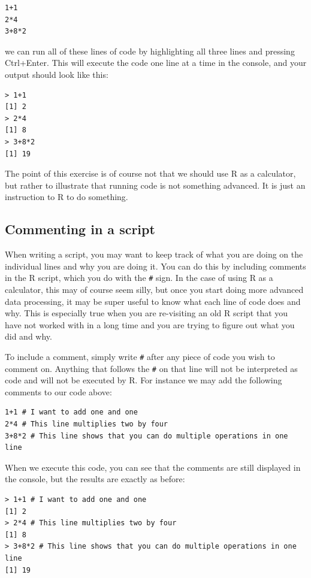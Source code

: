 \documentclass[
]{book}
\begin{document}
\begin{verbatim}
1+1
2*4
3+8*2
\end{verbatim}

we can run all of these lines of code by highlighting all three lines and pressing Ctrl+Enter. This will execute the code one line at a time in the console, and your output should look like this:

\begin{verbatim}
> 1+1
[1] 2
> 2*4
[1] 8
> 3+8*2
[1] 19
\end{verbatim}

The point of this exercise is of course not that we should use R as a calculator, but rather to illustrate that running code is not something advanced. It is just an instruction to R to do something.

\hypertarget{commenting-in-a-script}{%
\subsection{Commenting in a script}\label{commenting-in-a-script}}

When writing a script, you may want to keep track of what you are doing on the individual lines and why you are doing it. You can do this by including comments in the R script, which you do with the \texttt{\#} sign. In the case of using R as a calculator, this may of course seem silly, but once you start doing more advanced data processing, it may be super useful to know what each line of code does and why. This is especially true when you are re-visiting an old R script that you have not worked with in a long time and you are trying to figure out what you did and why.

To include a comment, simply write \texttt{\#} after any piece of code you wish to comment on. Anything that follows the \texttt{\#} on that line will not be interpreted as code and will not be executed by R. For instance we may add the following comments to our code above:

\begin{verbatim}
1+1 # I want to add one and one
2*4 # This line multiplies two by four
3+8*2 # This line shows that you can do multiple operations in one line
\end{verbatim}

When we execute this code, you can see that the comments are still displayed in the console, but the results are exactly as before:

\begin{verbatim}
> 1+1 # I want to add one and one
[1] 2
> 2*4 # This line multiplies two by four
[1] 8
> 3+8*2 # This line shows that you can do multiple operations in one line
[1] 19
\end{verbatim}
\end{document}

